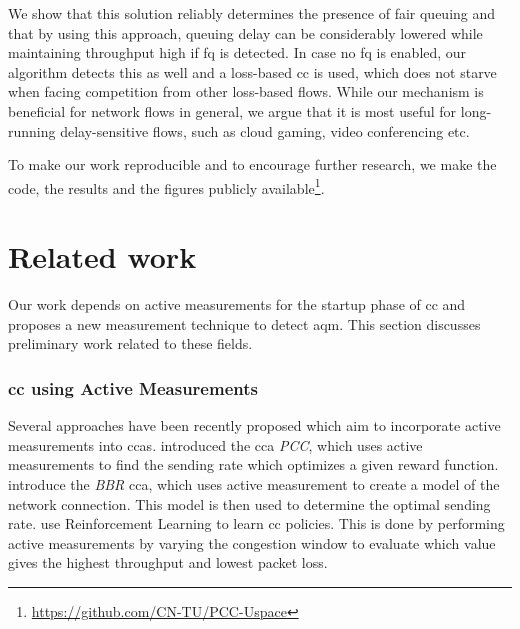 \documentclass[runningheads]{llncs}
\begin{document}
We show that this solution reliably determines the presence of fair queuing and that by using this approach, queuing delay can be considerably lowered while maintaining throughput high if \gls{fq} is detected. In case no \gls{fq} is enabled, our algorithm detects this as well and a loss-based \gls{cc} is used, which does not starve when facing competition from other loss-based flows. 
While our mechanism is beneficial for network flows in general, we argue that it is most useful for long-running delay-sensitive flows, such as cloud gaming, video conferencing etc. 

To make our work reproducible and to encourage further research, we make the code, the results and the figures publicly available\footnote{\url{https://github.com/CN-TU/PCC-Uspace}}. 

\section{Related work}
Our work depends on active measurements for the startup phase of \gls{cc} and proposes a new measurement technique to detect \gls{aqm}. This section discusses preliminary work related to these fields. 

\subsubsection{\gls{cc} using Active Measurements}
Several approaches have been recently proposed which aim to incorporate active measurements into \glspl{cca}. \cite{dong_pcc_2015,dong_pcc_2018} introduced the \gls{cca} \textit{PCC}, which uses active measurements to find the sending rate which optimizes a given reward function. \cite{cardwell_bbr:_2016} introduce the \textit{BBR} \gls{cca}, which uses active measurement to create a model of the network connection. This model is then used to determine the optimal sending rate. \cite{bachl_rax_2019} use Reinforcement Learning to learn \gls{cc} policies. This is done by performing active measurements by varying the congestion window to evaluate which value gives the highest throughput and lowest packet loss. 

\end{document}
